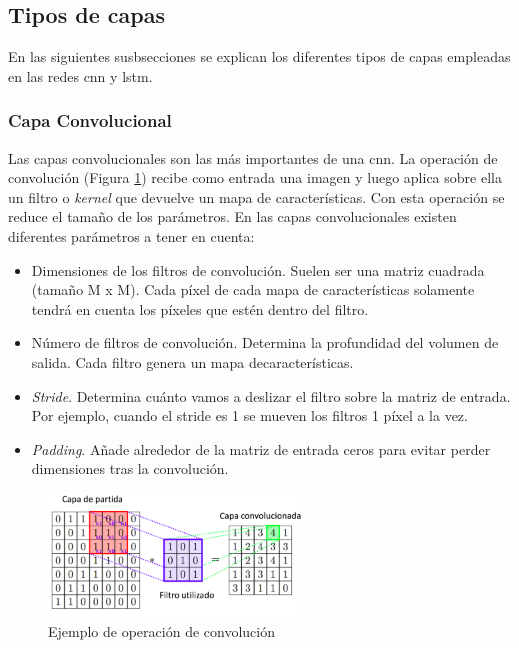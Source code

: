 \subsection{Tipos de capas}\label{tipos_capas}

En las siguientes susbsecciones se explican los diferentes tipos de capas empleadas en las redes \acrshort{cnn} y \acrshort{lstm}.


\subsubsection{Capa Convolucional}

Las capas convolucionales son las más importantes de una \acrshort{cnn}. La operación de convolución (Figura \ref{fig.convolucion}) recibe como entrada una imagen y luego aplica sobre ella un filtro o \textit{kernel} que devuelve un mapa de características. Con esta operación se reduce el tamaño de los parámetros. En las capas convolucionales existen diferentes parámetros a tener en cuenta:\\

\begin{itemize}
    \item Dimensiones de los filtros de convolución. Suelen ser una matriz cuadrada (tamaño M x M). Cada píxel de cada mapa de características solamente tendrá en cuenta los píxeles que estén dentro del filtro.
    
    \item Número de filtros de convolución. Determina la profundidad del volumen de salida. Cada filtro genera un mapa decaracterísticas.
    
    \item \textit{Stride}. Determina cuánto vamos a deslizar el filtro sobre la matriz de entrada. Por  ejemplo, cuando el stride es 1 se mueven los filtros 1 píxel a la vez. 
    
    \item \textit{Padding}. Añade alrededor de la matriz de entrada ceros para evitar perder dimensiones tras la convolución.
\end{itemize}

\begin{figure}[H]
  \begin{center}
    \includegraphics[width=0.6\textwidth]{figures/Introduccion/convolucion.png}
		\caption{Ejemplo de operación de convolución}
		\label{fig.convolucion}
		\end{center}
\end{figure}

